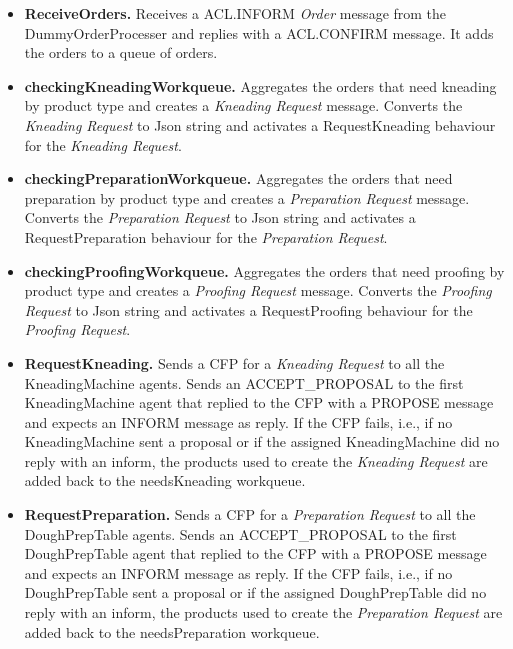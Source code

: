 \documentclass[paper=a4, fontsize=11pt]{scrartcl}
\begin{document}
	\begin{itemize}
		
		\item \textbf{ReceiveOrders.} Receives a ACL.INFORM \textit{Order} message from the DummyOrderProcesser and replies with a ACL.CONFIRM message. It adds the orders to a queue of orders.
		
		\item \textbf{checkingKneadingWorkqueue.} Aggregates the orders that need kneading by product type and creates a \textit{Kneading Request} message. Converts the \textit{Kneading Request} to Json string and activates a RequestKneading behaviour for the \textit{Kneading Request}. 
		
		\item \textbf{checkingPreparationWorkqueue.} Aggregates the orders that need preparation by product type and creates a \textit{Preparation Request} message. Converts the \textit{Preparation Request} to Json string and activates a RequestPreparation behaviour for the \textit{Preparation Request}.
		
		\item \textbf{checkingProofingWorkqueue.} Aggregates the orders that need proofing by product type and creates a \textit{Proofing Request} message. Converts the \textit{Proofing Request} to Json string and activates a RequestProofing behaviour for the \textit{Proofing Request}.
		
		\item \textbf{RequestKneading.} Sends a CFP for a \textit{Kneading Request} to all the KneadingMachine agents. Sends an ACCEPT\_PROPOSAL to the first KneadingMachine agent that replied to the CFP with a PROPOSE message and expects an INFORM message as reply. If the CFP fails, i.e., if no KneadingMachine sent a proposal or if the assigned KneadingMachine did no reply with an inform, the products used to create the \textit{Kneading Request} are added back to the needsKneading workqueue. 
		
		\item \textbf{RequestPreparation.} Sends a CFP for a \textit{Preparation Request} to all the DoughPrepTable agents. Sends an ACCEPT\_PROPOSAL to the first DoughPrepTable agent that replied to the CFP with a PROPOSE message and expects an INFORM message as reply. If the CFP fails, i.e., if no DoughPrepTable sent a proposal or if the assigned DoughPrepTable did no reply with an inform, the products used to create the \textit{Preparation Request} are added back to the needsPreparation workqueue.
		

\end{itemize}
\end{document}
